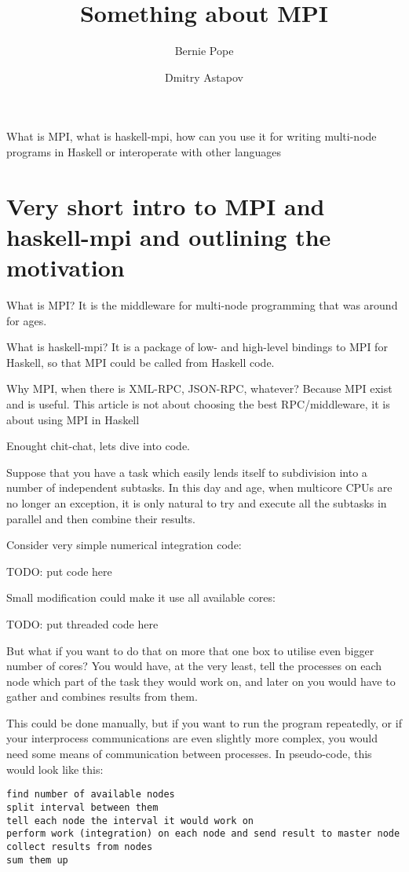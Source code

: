 \documentclass{tmr}
\title{Something about MPI}
\author{Bernie Pope\email{i-dont-know@which-you.would.prefer}}
\author{Dmitry Astapov\email{dastapov@gmail.com}}
\begin{document}
\begin{introduction} 
What is MPI, what is haskell-mpi, how can you use it for writing multi-node programs in Haskell or interoperate with other languages
\end{introduction}

\section{Very short intro to MPI and haskell-mpi and outlining the motivation}

What is MPI? It is the middleware for multi-node programming that was around for ages.

What is haskell-mpi? It is a package of low- and high-level bindings to MPI for Haskell, so that MPI could be called from Haskell code.

Why MPI, when there is XML-RPC, JSON-RPC, whatever? Because MPI exist and is useful. This article is not about choosing the best RPC/middleware, it is about using MPI in Haskell

Enought chit-chat, lets dive into code.

Suppose that you have a task which easily lends itself to subdivision
into a number of independent subtasks. In this day and age, when
multicore CPUs are no longer an exception, it is only natural to try
and execute all the subtasks in parallel and then combine their
results. 

Consider very simple numerical integration code:
\begin{haskell}
TODO: put code here
\end{haskell}

Small modification could make it use all available cores:
\begin{haskell}
TODO: put threaded code here
\end{haskell}


But what if you want to do that on more that one box to utilise even
bigger number of cores? You would have, at the very least, tell the
processes on each node which part of the task they would work on, and
later on you would have to gather and combines results from them.

This could be done manually, but if you want to run the program
repeatedly, or if your interprocess communications are even slightly
more complex, you would need some means of communication between
processes. In pseudo-code, this would look like this:

\begin{Verbatim}
find number of available nodes
split interval between them
tell each node the interval it would work on
perform work (integration) on each node and send result to master node
collect results from nodes
sum them up
\end{Verbatim}
\end{document}

